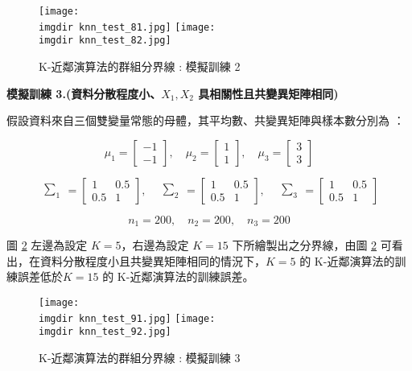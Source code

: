 \begin{figure}[H]
\centering
\texttt{[image: \\imgdir knn\_test\_81.jpg]}
\texttt{[image: \\imgdir knn\_test\_82.jpg]}
\caption{K-近鄰演算法的群組分界線 : 模擬訓練 2} 
\label{fig:knn_test_8}
\end{figure}

\textbf{\large 模擬訓練 3.(資料分散程度小、$X_1, X_2$ 具相關性且共變異矩陣相同)}

假設資料來自三個雙變量常態的母體，其平均數、共變異矩陣與樣本數分別為 ：

\[\mu_1 = \begin{bmatrix}
-1 \\
-1
\end{bmatrix}, \quad \mu_2 = \begin{bmatrix}
1 \\
1
\end{bmatrix}, \quad \mu_3 = \begin{bmatrix}
3 \\
3
\end{bmatrix}\]

\[\begin{matrix} \sum_{1} \end{matrix} = \begin{bmatrix}
1 & 0.5\\
0.5 & 1
\end{bmatrix}, \quad \begin{matrix} \sum_{2} \end{matrix} = \begin{bmatrix}
1 & 0.5\\
0.5 & 1
\end{bmatrix}, \quad \begin{matrix} \sum_{3} \end{matrix} = \begin{bmatrix}
1 & 0.5\\
0.5 & 1
\end{bmatrix}\]

\[n_1 = 200, \quad n_2 = 200, \quad n_3 = 200\]

圖 \ref{fig:knn_test_9} 左邊為設定 $K =5$，右邊為設定 $K = 15$ 下所繪製出之分界線，由圖 \ref{fig:knn_test_9} 可看出，在資料分散程度小且共變異矩陣相同的情況下，$K = 5$ 的 K-近鄰演算法的訓練誤差低於$K = 15$ 的 K-近鄰演算法的訓練誤差。

\begin{figure}[H]
\centering
\texttt{[image: \\imgdir knn\_test\_91.jpg]}
\texttt{[image: \\imgdir knn\_test\_92.jpg]}
\caption{K-近鄰演算法的群組分界線 : 模擬訓練 3} 
\label{fig:knn_test_9}
\end{figure}

